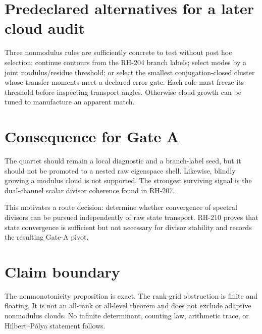 \documentclass[12pt]{article}
\theoremstyle{remark}\newtheorem{remark}[theorem]{Remark}
\begin{document}
\section{Predeclared alternatives for a later cloud audit}

Three nonmodulus rules are sufficiently concrete to test without post hoc
selection: continue contours from the RH-204 branch labels; select modes by
a joint modulus/residue threshold; or select the smallest conjugation-closed
cluster whose transfer moments meet a declared error gate.  Each rule must
freeze its threshold before inspecting transport angles.  Otherwise cloud
growth can be tuned to manufacture an apparent match.

\section{Consequence for Gate A}

The quartet should remain a local diagnostic and a branch-label seed, but it
should not be promoted to a nested raw eigenspace shell.  Likewise, blindly
growing a modulus cloud is not supported.  The strongest surviving signal is
the dual-channel scalar divisor coherence found in RH-207.

This motivates a route decision: determine whether convergence of spectral
divisors can be pursued independently of raw state transport.  RH-210 proves
that state convergence is sufficient but not necessary for divisor
stability and records the resulting Gate-A pivot.

\section{Claim boundary}

The nonmonotonicity proposition is exact.  The rank-grid obstruction is
finite and floating.  It is not an all-rank or all-level theorem and does
not exclude adaptive nonmodulus clouds.  No infinite determinant, counting
law, arithmetic trace, or Hilbert--P\'olya statement follows.


\end{document}
